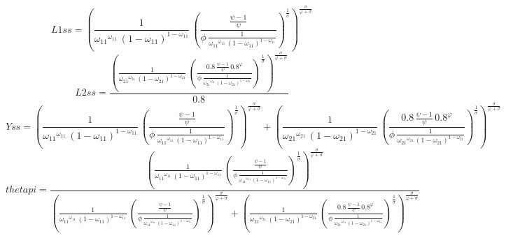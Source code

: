 \begin{dmath*}
L1ss = \left(\frac{1}{{{\omega_{11}}}^{{{\omega_{11}}}}\, \left(1-{{\omega_{11}}}\right)^{1-{{\omega_{11}}}}}\, \left(\frac{\frac{{{\psi}}-1}{{{\psi}}}}{{{\phi}}\, \frac{1}{{{\omega_{11}}}^{{{\omega_{11}}}}\, \left(1-{{\omega_{11}}}\right)^{1-{{\omega_{11}}}}}}\right)^{\frac{1}{{{\sigma}}}}\right)^{\frac{{{\sigma}}}{{{\varphi}}+{{\sigma}}}}
\end{dmath*}
\begin{dmath*}
L2ss = \frac{\left(\frac{1}{{{\omega_{21}}}^{{{\omega_{21}}}}\, \left(1-{{\omega_{21}}}\right)^{1-{{\omega_{21}}}}}\, \left(\frac{0.8\, \frac{{{\psi}}-1}{{{\psi}}}\, 0.8^{{{\varphi}}}}{{{\phi}}\, \frac{1}{{{\omega_{21}}}^{{{\omega_{21}}}}\, \left(1-{{\omega_{21}}}\right)^{1-{{\omega_{21}}}}}}\right)^{\frac{1}{{{\sigma}}}}\right)^{\frac{{{\sigma}}}{{{\varphi}}+{{\sigma}}}}}{0.8}
\end{dmath*}
\begin{dmath*}
Yss = \left(\frac{1}{{{\omega_{11}}}^{{{\omega_{11}}}}\, \left(1-{{\omega_{11}}}\right)^{1-{{\omega_{11}}}}}\, \left(\frac{\frac{{{\psi}}-1}{{{\psi}}}}{{{\phi}}\, \frac{1}{{{\omega_{11}}}^{{{\omega_{11}}}}\, \left(1-{{\omega_{11}}}\right)^{1-{{\omega_{11}}}}}}\right)^{\frac{1}{{{\sigma}}}}\right)^{\frac{{{\sigma}}}{{{\varphi}}+{{\sigma}}}}+\left(\frac{1}{{{\omega_{21}}}^{{{\omega_{21}}}}\, \left(1-{{\omega_{21}}}\right)^{1-{{\omega_{21}}}}}\, \left(\frac{0.8\, \frac{{{\psi}}-1}{{{\psi}}}\, 0.8^{{{\varphi}}}}{{{\phi}}\, \frac{1}{{{\omega_{21}}}^{{{\omega_{21}}}}\, \left(1-{{\omega_{21}}}\right)^{1-{{\omega_{21}}}}}}\right)^{\frac{1}{{{\sigma}}}}\right)^{\frac{{{\sigma}}}{{{\varphi}}+{{\sigma}}}}
\end{dmath*}
\begin{dmath*}
thetapi = \frac{\left(\frac{1}{{{\omega_{11}}}^{{{\omega_{11}}}}\, \left(1-{{\omega_{11}}}\right)^{1-{{\omega_{11}}}}}\, \left(\frac{\frac{{{\psi}}-1}{{{\psi}}}}{{{\phi}}\, \frac{1}{{{\omega_{11}}}^{{{\omega_{11}}}}\, \left(1-{{\omega_{11}}}\right)^{1-{{\omega_{11}}}}}}\right)^{\frac{1}{{{\sigma}}}}\right)^{\frac{{{\sigma}}}{{{\varphi}}+{{\sigma}}}}}{\left(\frac{1}{{{\omega_{11}}}^{{{\omega_{11}}}}\, \left(1-{{\omega_{11}}}\right)^{1-{{\omega_{11}}}}}\, \left(\frac{\frac{{{\psi}}-1}{{{\psi}}}}{{{\phi}}\, \frac{1}{{{\omega_{11}}}^{{{\omega_{11}}}}\, \left(1-{{\omega_{11}}}\right)^{1-{{\omega_{11}}}}}}\right)^{\frac{1}{{{\sigma}}}}\right)^{\frac{{{\sigma}}}{{{\varphi}}+{{\sigma}}}}+\left(\frac{1}{{{\omega_{21}}}^{{{\omega_{21}}}}\, \left(1-{{\omega_{21}}}\right)^{1-{{\omega_{21}}}}}\, \left(\frac{0.8\, \frac{{{\psi}}-1}{{{\psi}}}\, 0.8^{{{\varphi}}}}{{{\phi}}\, \frac{1}{{{\omega_{21}}}^{{{\omega_{21}}}}\, \left(1-{{\omega_{21}}}\right)^{1-{{\omega_{21}}}}}}\right)^{\frac{1}{{{\sigma}}}}\right)^{\frac{{{\sigma}}}{{{\varphi}}+{{\sigma}}}}}
\end{dmath*}
